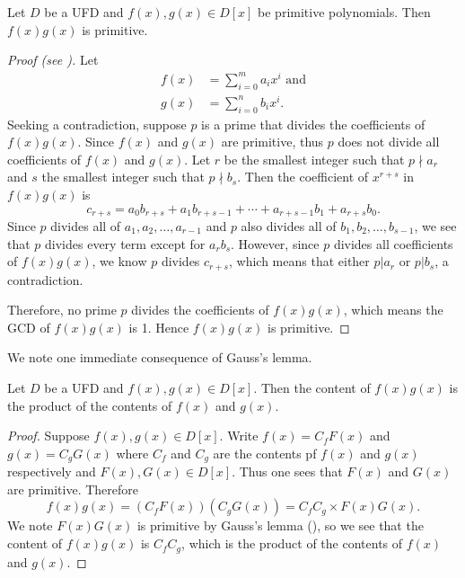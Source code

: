 \begin{lemma}[Gauss]\label{lemma-gauss}
    Let $D$ be a UFD and $f(x), g(x) \in D[x]$ be primitive polynomials. Then $f(x)g(x)$ is primitive.
\end{lemma}
\begin{proof}[Proof (see {\cite[Theorem 18.24]{judson_beezer_2022}})]
    Let
    \begin{align*}
        f(x) &= \sum_{i=0}^m a_ix^i \text{ and}\\
        g(x) &= \sum_{i=0}^n b_ix^i.
    \end{align*}
    Seeking a contradiction, suppose $p$ is a prime that divides the coefficients of $f(x)g(x)$. Since $f(x)$ and $g(x)$ are primitive, thus $p$ does not divide all coefficients of $f(x)$ and $g(x)$. Let $r$ be the smallest integer such that $p \nmid a_r$ and $s$ the smallest integer such that $p \nmid b_s$. Then the coefficient of $x^{r+s}$ in $f(x)g(x)$ is
    \[
        c_{r+s} = a_0b_{r+s} + a_1b_{r+s-1} + \cdots + a_{r+s-1}b_1 + a_{r+s}b_0.
    \]
    Since $p$ divides all of $a_1, a_2, \dots, a_{r-1}$ and $p$ also divides all of $b_1, b_2, \dots, b_{s-1}$, we see that $p$ divides every term except for $a_rb_s$. However, since $p$ divides all coefficients of $f(x)g(x)$, we know $p$ divides $c_{r+s}$, which means that either $p \vert a_r$ or $p \vert b_s$, a contradiction.
    
    Therefore, no prime $p$ divides the coefficients of $f(x)g(x)$, which means the GCD of $f(x)g(x)$ is 1. Hence $f(x)g(x)$ is primitive.
\end{proof}

We note one immediate consequence of Gauss's lemma.

\begin{corollary}\label{corollary-content-of-product-is-product-of-content-for-polynomials}
    Let $D$ be a UFD and $f(x), g(x) \in D[x]$. Then the content of $f(x)g(x)$ is the product of the contents of $f(x)$ and $g(x)$.
\end{corollary}
\begin{proof}
    Suppose $f(x), g(x) \in D[x]$. Write $f(x) = C_f F(x)$ and $g(x) = C_g G(x)$ where $C_f$ and $C_g$ are the contents pf $f(x)$ and $g(x)$ respectively and $F(x), G(x) \in D[x]$. Thus one sees that $F(x)$ and $G(x)$ are primitive. Therefore
    \[
        f(x)g(x) = (C_f F(x))(C_g G(x)) = C_fC_g \times F(x)G(x).
    \]
    We note $F(x)G(x)$ is primitive by Gauss's lemma (), so we see that the content of $f(x)g(x)$ is $C_fC_g$, which is the product of the contents of $f(x)$ and $g(x)$.
\end{proof}

